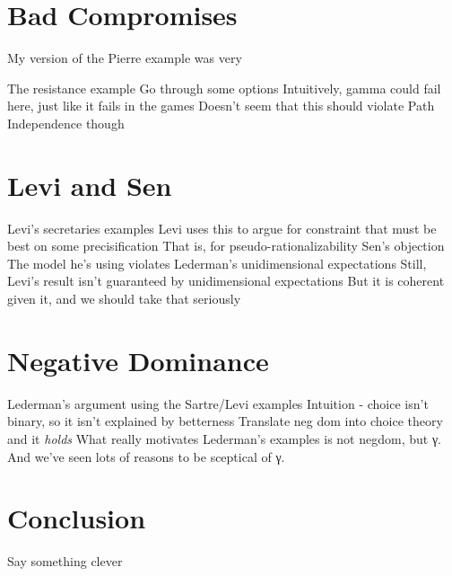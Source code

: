 \documentclass[
  11pt,
  letterpaper,
  DIV=11,
  numbers=noendperiod,
  twoside]{scrartcl}
\begin{document}
\section{Bad Compromises}\label{sec-badcomp}

My version of the Pierre example was very

The resistance example Go through some options Intuitively, gamma could
fail here, just like it fails in the games Doesn't seem that this should
violate Path Independence though

\section{Levi and Sen}\label{sec-levisen}

Levi's secretaries examples Levi uses this to argue for constraint that
must be best on some precisification That is, for
pseudo-rationalizability Sen's objection The model he's using violates
Lederman's unidimensional expectations Still, Levi's result isn't
guaranteed by unidimensional expectations But it is coherent given it,
and we should take that seriously

\section{Negative Dominance}\label{sec-negdom}

Lederman's argument using the Sartre/Levi examples Intuition - choice
isn't binary, so it isn't explained by betterness Translate neg dom into
choice theory and it \emph{holds} What really motivates Lederman's
examples is not negdom, but γ. And we've seen lots of reasons to be
sceptical of γ.

\section{Conclusion}\label{conclusion}

Say something clever
\end{document}
